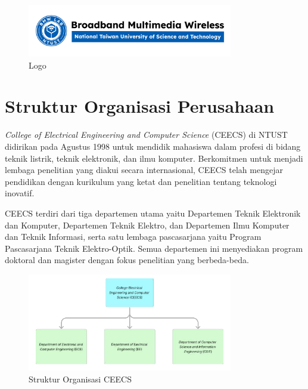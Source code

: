 \begin{figure}[H]
    \centering
    \includegraphics[width=0.8\textwidth]{assets/pics/bmw.jpg}
    \caption{Logo \namaLab}
    \label{fig:logo_bmw}
\end{figure}

\section{Struktur Organisasi Perusahaan}

\textit{College of Electrical Engineering and Computer Science} (CEECS) di NTUST didirikan pada Agustus 1998 untuk mendidik mahasiswa dalam profesi di bidang teknik listrik, teknik elektronik, dan ilmu komputer. Berkomitmen untuk menjadi lembaga penelitian yang diakui secara internasional, CEECS telah mengejar pendidikan dengan kurikulum yang ketat dan penelitian tentang teknologi inovatif.

CEECS terdiri dari tiga departemen utama yaitu Departemen Teknik Elektronik dan Komputer, Departemen Teknik Elektro, dan Departemen Ilmu Komputer dan Teknik Informasi, serta satu lembaga pascasarjana yaitu Program Pascasarjana Teknik Elektro-Optik. Semua departemen ini menyediakan program doktoral dan magister dengan fokus penelitian yang berbeda-beda.

\begin{figure}[H]
    \centering
    \includegraphics[width=0.8\textwidth]{assets/pics/ceecs.png}
    \caption{Struktur Organisasi CEECS}
    \label{fig:struktur_ceecs}
\end{figure}

